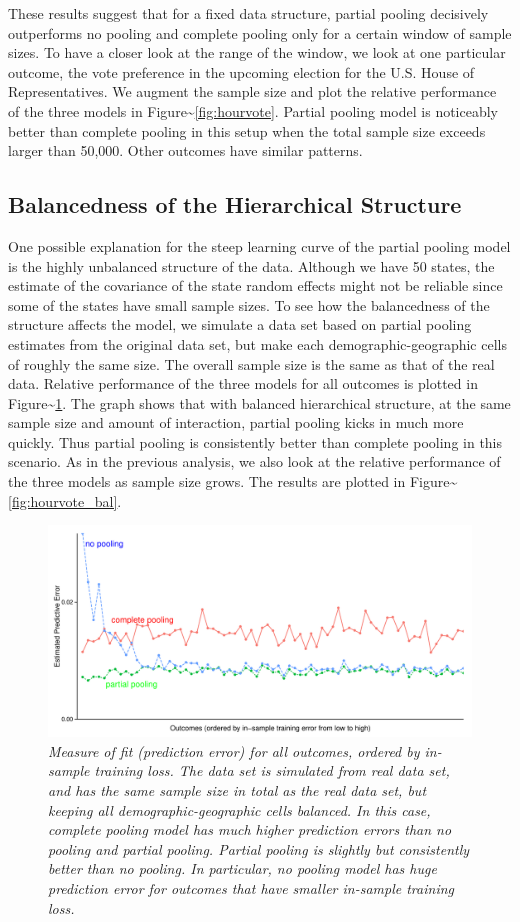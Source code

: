 \documentclass[11pt,article,oneside]{memoir}
\begin{document}
These results suggest that for a fixed data structure, partial pooling
decisively outperforms no pooling and complete pooling only for a
certain window of sample sizes. To have a closer look at the range of
the window, we look at one particular outcome, the vote preference in
the upcoming election for the U.S. House of Representatives. We augment
the sample size and plot the relative performance of the three models in
Figure\textasciitilde{}\ref{fig:hourvote}. Partial pooling model is
noticeably better than complete pooling in this setup when the total
sample size exceeds larger than 50,000. Other outcomes have similar
patterns.

\subsection{Balancedness of the Hierarchical
Structure}\label{balancedness-of-the-hierarchical-structure}

One possible explanation for the steep learning curve of the partial
pooling model is the highly unbalanced structure of the data. Although
we have 50 states, the estimate of the covariance of the state random
effects might not be reliable since some of the states have small sample
sizes. To see how the balancedness of the structure affects the model,
we simulate a data set based on partial pooling estimates from the
original data set, but make each demographic-geographic cells of roughly
the same size. The overall sample size is the same as that of the real
data. Relative performance of the three models for all outcomes is
plotted in Figure\textasciitilde{}\ref{fig:figbal}. The graph shows that
with balanced hierarchical structure, at the same sample size and amount
of interaction, partial pooling kicks in much more quickly. Thus partial
pooling is consistently better than complete pooling in this scenario.
As in the previous analysis, we also look at the relative performance of
the three models as sample size grows. The results are plotted in
Figure\textasciitilde{}\ref{fig:hourvote_bal}.

\begin{figure}[h]
  \centering
  \includegraphics[width=.45\textwidth]{alloutcomesxbal.pdf}
  \caption{\em Measure of fit (prediction error) for all outcomes, ordered by
    in-sample training loss. The data set is simulated from real data set, and
    has the same sample size in total as the real data set, but keeping all
    demographic-geographic cells balanced. In this case, complete pooling model
    has much higher prediction errors than no pooling and partial
    pooling. Partial pooling is slightly but consistently better than no
    pooling. In particular, no pooling model has huge prediction error for
    outcomes that have smaller in-sample training loss.}
  \label{fig:figbal}
\end{figure}
\end{document}
